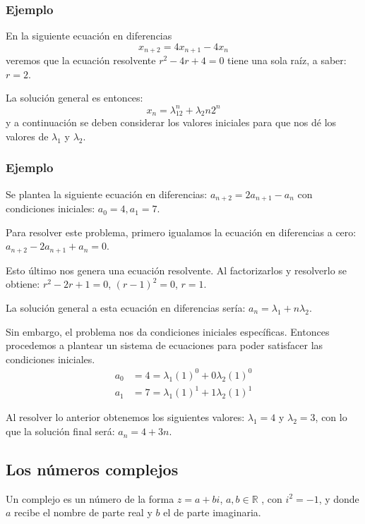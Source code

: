 \documentclass{article}
\begin{document}
\subsubsection{Ejemplo}

En la siguiente ecuación en diferencias
\begin{equation}
  \label{eq:1}
  x_{n+2}=4x_{n+1}-4x_{n}
\end{equation}
veremos que la ecuación resolvente $r^2-4r+4=0$ tiene una sola raíz, a
saber: $r=2$.

La solución general es entonces:
$$x_n=\lambda_12^n+\lambda_2n2^n$$
y a continuación se deben considerar los valores iniciales para que
nos dé los valores de $\lambda_1$ y $\lambda_2$.

\subsubsection{Ejemplo}

Se plantea la siguiente ecuación en diferencias:
$a_{n+2}=2a_{n+1}-a_{n}$ con condiciones iniciales: $a_{0}=4, a_{1}=7$.

Para resolver este problema, primero igualamos la ecuación en diferencias a
cero: $a_{n+2}-2a_{n+1}+a_{n}=0$.

Esto último nos genera una ecuación resolvente. Al factorizarlos y
resolverlo se obtiene: $r^2-2r+1=0$, ${(r-1)^2=0}$, ${r=1}$.

La solución general a esta ecuación en diferencias sería:
$a_{n}=\lambda_{1}+n\lambda_{2}$.

Sin embargo, el problema nos da condiciones iniciales
específicas. Entonces procedemos a plantear un sistema de ecuaciones
para poder satisfacer las condiciones iniciales.
\begin{align*}
  a_{0}&=4=\lambda_{1}(1)^0+0\lambda_{2}(1)^0\\
  a_{1}&=7=\lambda_{1}(1)^1+1\lambda_{2}(1)^1
\end{align*}

Al resolver lo anterior obtenemos los siguientes valores:
$\lambda_{1}=4$ y $\lambda_{2}=3$, con lo que la solución final será:
$a_{n}=4+3n$.


\subsection{Los números  complejos}

Un complejo es un número de la forma $z=a+bi$, $a,b\in\mathbb{R}$ ,
con $i^2=-1$, y donde $a$ recibe el nombre de parte real y $b$ el de
parte imaginaria.
\end{document}
